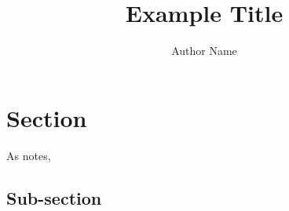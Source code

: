 \documentclass[man, 12pt]{apa7} %
\title{Example Title }
\author{Author Name}
\affiliation{Univeristy
}
\begin{document}
\maketitle

\section{Section}

As \textcite{knowles78} notes, \lipsum[1-5]

\subsection{Sub-section}

\lipsum[1-5] \parencite{knowles78}


\begin{quote}

    \lipsum[1-1]
\end{quote}

\hfill \parencite[p. 2]{knowles78}


\printbibliography
\end{document}
